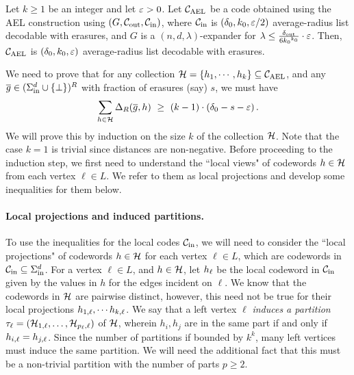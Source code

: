 \begin{theorem}\label{thm:main_technical_avg}
%
Let $k\geq 1$ be an integer and let $\varepsilon > 0$. Let ${ {\mathcal C}_{\mathrm{AEL}} }$ be a
code obtained using the AEL construction using  $(G, {\mathcal C}_{\mathrm{out}}, {\mathcal C}_{\mathrm{in}})$, where ${\mathcal C}_{\mathrm{in}}$ is $(\delta_0, k_0, \varepsilon/2)$ average-radius list decodable with erasures, and $G$ is a $(n,d,\lambda)$-expander for $\lambda \leq \frac{\delta_{\mathrm{out}}}{6{k_0}^{k_0}} \cdot \varepsilon$. 
%
Then, ${ {\mathcal C}_{\mathrm{AEL}} }$ is $(\delta_{0}, k_0,\varepsilon)$ average-radius list decodable with erasures.
\end{theorem}
%
%
We need to prove that for any collection ${\mathcal H} = \left\{ h_1,\cdots , h_k\right\} \subseteq { {\mathcal C}_{\mathrm{AEL}} }$, and any $\overline{g} \in (\Sigma_{\mathrm{in}}^d \cup \{\bot\})^R$ with fraction of erasures (say) $s$, we must have 
\[
\sum_{h \in {\mathcal H}} \Delta_R(\overline{g}, h) ~\geq~ (k-1) \cdot (\delta_0 - s - \varepsilon) \,.
\]
We will prove this by induction on the size $k$ of the collection ${\mathcal H}$. 
%
Note that the case $k=1$ is trivial since distances are non-negative. 
Before proceeding to the induction step, we first need to understand the ``local views" of codewords $h \in {\mathcal H}$ from each vertex $\ell \in L$. We refer to them as local projections and develop some inequalities for them below.

%

\vspace{-5 pt}
\paragraph{Local projections and induced partitions.}
%
To use the inequalities for the local codes ${\mathcal C}_{\mathrm{in}}$, we will need to consider the ``local projections" of codewords $h \in {\mathcal H}$ for each vertex $\ell \in L$, which are codewords in ${\mathcal C}_{\mathrm{in}} \subseteq \Sigma_{\mathrm{in}}^d$. 
%
For a vertex $\ell \in L$, and $h \in {\mathcal H}$, let $h_{\ell}$ be the local codeword in ${\mathcal C}_{\mathrm{in}}$ given by the values in $h$ for the edges incident on $\ell$.
%
We know that the codewords in ${\mathcal H}$ are pairwise distinct, however, this need not be true for their local projections $h_{1,\ell},\cdots h_{k,\ell}$. 
%
We say that a left vertex $\ell$ \textit{induces a partition} $\tau_{\ell} = ({\mathcal H}_{1,\ell}, \ldots, {\mathcal H}_{p_{\ell},\ell})$ of ${\mathcal H}$, wherein $h_i, h_j$ are in the same part if and only if $h_{i,\ell} = h_{j,\ell}$. 
%
Since the number of partitions if bounded by $k^k$, many left vertices must induce the same partition. We will need the additional fact that this must be a non-trivial partition with the number of parts $p \geq 2$.

